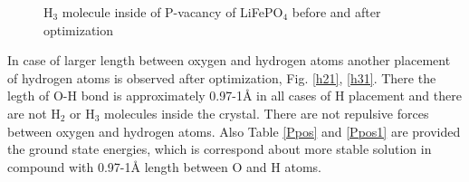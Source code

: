 \begin{figure}[h]
\begin{minipage}[h]{0.48\linewidth}
\end{minipage}
\hfill
\begin{minipage}[h]{0.48\linewidth}
\end{minipage}
\caption{H$_3$ molecule inside of P-vacancy of LiFePO$_4$ before and after optimization}
\label{h3}
\end{figure}

In case of larger length between oxygen and hydrogen atoms another placement of hydrogen atoms is observed after optimization, Fig. \ref{h21}, \ref{h31}. There the legth of O-H bond is approximately 0.97-1\AA $ $ in all cases of H placement and there are not H$_2$ or H$_3$ molecules inside the crystal. There are not repulsive forces between oxygen and hydrogen atoms. Also Table \ref{Ppos} and \ref{Ppos1} are provided the ground state energies, which is correspond about more stable solution in compound with 0.97-1\AA$ $ length between O and H atoms.

